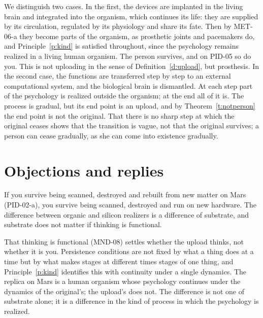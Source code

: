 \documentclass{situationist-preprint}
\begin{document}
We distinguish two cases. In the first, the devices are implanted in the living brain and integrated into the organism, which continues its life: they are supplied by its circulation, regulated by its physiology and share its fate. Then by MET-06-a they become parts of the organism, as prosthetic joints and pacemakers do, and Principle~\ref{p:kind} is satisfied throughout, since the psychology remains realized in a living human organism. The person survives, and on PID-05 so do you. This is not uploading in the sense of Definition~\ref{d:upload}, but prosthesis. In the second case, the functions are transferred step by step to an external computational system, and the biological brain is dismantled. At each step part of the psychology is realized outside the organism; at the end all of it is. The process is gradual, but its end point is an upload, and by Theorem~\ref{t:notperson} the end point is not the original. That there is no sharp step at which the original ceases shows that the transition is vague, not that the original survives; a person can cease gradually, as she can come into existence gradually.

\section{Objections and replies}\label{s:obj}

\begin{objection}
If you survive being scanned, destroyed and rebuilt from new matter on Mars (PID-02-a), you survive being scanned, destroyed and run on new hardware. The difference between organic and silicon realizers is a difference of substrate, and substrate does not matter if thinking is functional.
\end{objection}

\begin{reply}
That thinking is functional (MND-08) settles whether the upload thinks, not whether it is you. Persistence conditions are not fixed by what a thing does at a time but by what makes stages at different times stages of one thing, and Principle~\ref{p:kind} identifies this with continuity under a single dynamics. The replica on Mars is a human organism whose psychology continues under the dynamics of the original's; the upload's does not. The difference is not one of substrate alone; it is a difference in the kind of process in which the psychology is realized.
\end{reply}
\end{document}
